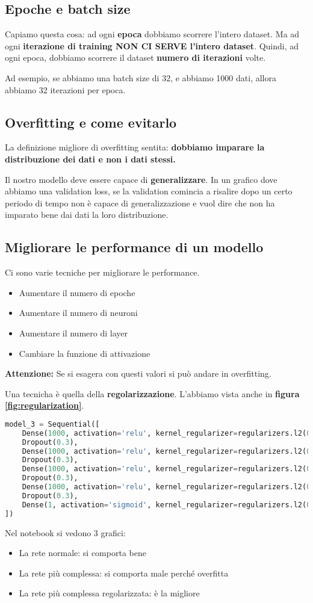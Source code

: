 \subsection{Epoche e batch size}

Capiamo questa cosa: ad ogni \textbf{epoca} dobbiamo scorrere l'intero dataset.
Ma ad ogni \textbf{iterazione di training NON CI SERVE l'intero dataset}.
Quindi, ad ogni epoca, dobbiamo scorrere il dataset \textbf{numero di
    iterazioni} volte.

Ad esempio, se abbiamo una batch size di 32, e abbiamo 1000 dati, allora
abbiamo 32 iterazioni per epoca.

\subsection{Overfitting e come evitarlo}

La definizione migliore di overfitting sentita: \textbf{dobbiamo imparare la
    distribuzione dei dati e non i dati stessi.}

Il nostro modello deve essere capace di \textbf{generalizzare}. In un grafico
dove abbiamo una validation loss, se la validation comincia a risalire dopo un
certo periodo di tempo non è capace di generalizzazione e vuol dire che non ha
imparato bene dai dati la loro distribuzione.

\subsection{Migliorare le performance di un modello}

Ci sono varie tecniche per migliorare le performance.

\begin{itemize}
    \item Aumentare il numero di epoche
    \item Aumentare il numero di neuroni
    \item Aumentare il numero di layer
    \item Cambiare la funzione di attivazione
\end{itemize}

\textbf{Attenzione:} Se si esagera con questi valori si può andare in overfitting.

Una tecnicha è quella della \textbf{regolarizzazione}. L'abbiamo vista anche in
\textbf{figura \ref{fig:regularization}}.%

\begin{lstlisting}[language=Python]
    model_3 = Sequential([
    Dense(1000, activation='relu', kernel_regularizer=regularizers.l2(0.01), input_shape=(10,)),
    Dropout(0.3),
    Dense(1000, activation='relu', kernel_regularizer=regularizers.l2(0.01)),
    Dropout(0.3),
    Dense(1000, activation='relu', kernel_regularizer=regularizers.l2(0.01)),
    Dropout(0.3),
    Dense(1000, activation='relu', kernel_regularizer=regularizers.l2(0.01)),
    Dropout(0.3),
    Dense(1, activation='sigmoid', kernel_regularizer=regularizers.l2(0.01)),
])
\end{lstlisting}

Nel notebook si vedono 3 grafici:
\begin{itemize}
    \item La rete normale: si comporta bene
    \item La rete più complessa: si comporta male perché overfitta 
    \item La rete più complessa regolarizzata: è la migliore
\end{itemize}